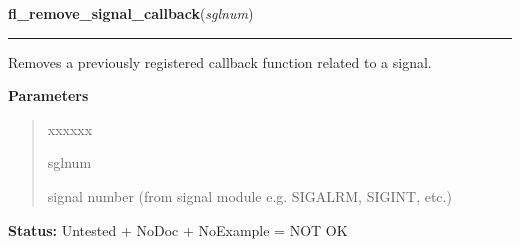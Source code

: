 \hspace{.8\funcindent}\begin{boxedminipage}{\funcwidth}

    \raggedright \textbf{fl\_remove\_signal\_callback}(\textit{sglnum})

    \vspace{-1.5ex}

    \rule{\textwidth}{0.5\fboxrule}
\setlength{\parskip}{2ex}
    Removes a previously registered callback function related to a signal.

\setlength{\parskip}{1ex}
      \textbf{Parameters}
      \vspace{-1ex}

      \begin{quote}
        \begin{Ventry}{xxxxxx}

          \item[sglnum]

          signal number (from signal module e.g. SIGALRM, SIGINT, etc.)

        \end{Ventry}

      \end{quote}

\textbf{Status:} Untested + NoDoc + NoExample = NOT OK



    \end{boxedminipage}

    \label{xformslib:library:fl_signal_caught}

    \vspace{0.5ex}

